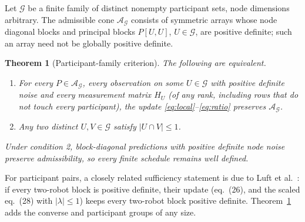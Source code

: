 \documentclass[11pt,a4paper]{article}
\numberwithin{equation}{section}
\newtheorem{theorem}{Theorem}[section]
\theoremstyle{remark}\newtheorem{remark}[theorem]{Remark}
\begin{document}
Let $\mathcal G$ be a finite family of distinct nonempty participant sets, node dimensions
arbitrary. The admissible cone $\mathcal A_{\mathcal G}$ consists of symmetric arrays whose node
diagonal blocks and principal blocks $P[U,U]$, $U\in\mathcal G$, are positive definite; such an
array need not be globally positive definite.

\begin{theorem}[Participant-family criterion]\label{thm:family}
The following are equivalent.
\begin{enumerate}
\item For every $P\in\mathcal A_{\mathcal G}$, every observation on some $U\in\mathcal G$ with
positive definite noise and every measurement matrix $H_U$ (of any rank, including rows that
do not touch every participant), the update \eqref{eq:local}--\eqref{eq:ratio} preserves
$\mathcal A_{\mathcal G}$.
\item Any two distinct $U,V\in\mathcal G$ satisfy $|U\cap V|\le1$.
\end{enumerate}
Under condition 2, block-diagonal predictions with positive definite node noise preserve
admissibility, so every finite schedule remains well defined.
\end{theorem}

For participant pairs, a closely related sufficiency statement is due to Luft et
al.~\citep[Proposition~1]{Luft2018}: if every two-robot block is positive definite, their update
(eq.~(26), and the scaled eq.~(28) with $|\lambda|\le1$) keeps every two-robot block positive
definite. Theorem~\ref{thm:family} adds the converse and participant groups of any size.
\end{document}
